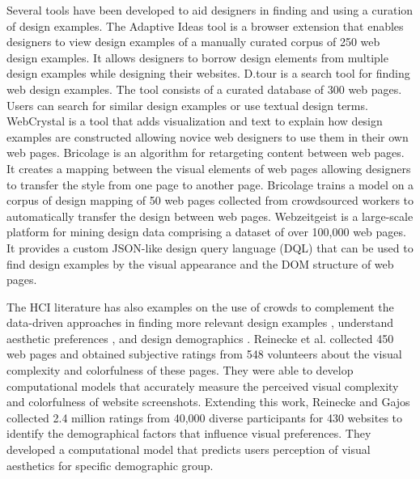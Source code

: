Several tools have been developed to aid designers in finding and using a curation of design examples.
The Adaptive Ideas tool \cite{lee_2010_CHI} is a browser extension that enables designers to view design examples of a manually curated corpus of 250 web design examples.
It allows designers to borrow design elements from multiple design examples while designing their websites.
D.tour \cite{ritchie_2011_CHI} is a search tool for finding web design examples.
The tool consists of a curated database of 300 web pages.
Users can search for similar design examples or use textual design terms.
WebCrystal \cite{chang_2012_CHI} is a tool that adds visualization and text to explain how design examples are constructed allowing novice web designers to use them in their own web pages.
Bricolage \cite{kumar_2011_CHI} is an algorithm for retargeting content between web pages.
It creates a mapping between the visual elements of web pages allowing designers to transfer the style from one page to another page.
Bricolage trains a model on a corpus of design mapping of 50 web pages collected from crowdsourced workers to automatically transfer the design between web pages.
Webzeitgeist \cite{kumar_2013_CHI} is a large-scale platform for mining design data comprising a dataset of over 100,000 web pages.
It provides a custom JSON-like design query language (DQL) that can be used to find design examples by the visual appearance and the DOM structure of web pages.


The HCI literature has also examples on the use of crowds to complement the data-driven approaches in finding more relevant design examples \cite{kumar_2011_CHI, spirin_2014_WWW}, understand aesthetic preferences \cite{reinecke_2013_CHI}, and design demographics \cite{reinecke_2014_CHI}. 
Reinecke et al. \cite{reinecke_2013_CHI} collected 450 web pages and obtained subjective ratings from 548 volunteers about the visual complexity and colorfulness of these pages.
They were able to develop computational models that accurately measure the perceived visual complexity and colorfulness of website screenshots.
Extending this work, Reinecke and Gajos \cite{reinecke_2014_CHI} collected 2.4 million ratings from 40,000 diverse participants for 430 websites to identify the demographical factors that influence visual preferences. 
They developed a computational model that predicts users perception of visual aesthetics for specific demographic group.